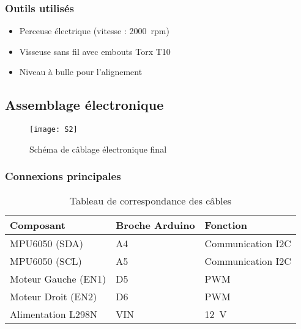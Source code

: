 \documentclass{report}
\begin{document}
\subsubsection{Outils utilisés}
\begin{itemize}
    \item Perceuse électrique (vitesse : \SI{2000}{rpm})
    \item Visseuse sans fil avec embouts Torx T10
    \item Niveau à bulle pour l’alignement
\end{itemize}

\subsection{Assemblage électronique}
\label{subsec:assemblage_elec}

\begin{figure}[htbp]
    \centering
    \texttt{[image: S2]}
    \caption{Schéma de câblage électronique final}
    \label{fig:cablage_elec}
\end{figure}

\subsubsection{Connexions principales}
\begin{table}[htbp]
    \centering
    \caption{Tableau de correspondance des câbles}
    \label{tab:cables}
    \begin{tabular}{|l|l|l|}
        \hline
        \textbf{Composant} & \textbf{Broche Arduino} & \textbf{Fonction} \\
        \hline
        MPU6050 (SDA) & A4 & Communication I2C \\
        MPU6050 (SCL) & A5 & Communication I2C \\
        Moteur Gauche (EN1) & D5 & PWM \\
        Moteur Droit (EN2) & D6 & PWM \\
        Alimentation L298N & VIN & \SI{12}{V} \\
        \hline
    \end{tabular}
\end{table}
\end{document}
